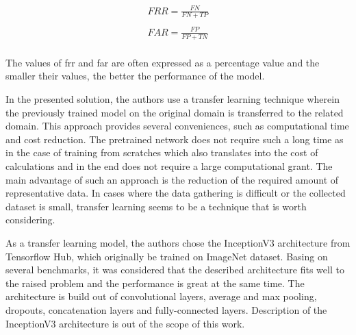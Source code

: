 \begin{gather*}
    FRR = \frac{FN}{FN + TP}\\
    \\
    FAR = \frac{FP}{FP + TN}\\
\end{gather*}

The values of \gls{frr} and \gls{far} are often expressed as a percentage value and the smaller their values, the better the performance of the model.

In the presented solution, the authors use a transfer learning technique wherein the previously trained model on the original domain is transferred to the related domain.
This approach provides several conveniences, such as computational time and cost reduction.
The pretrained network does not require such a long time as in the case of training from scratches which also translates into the cost of calculations and in the end does not require a large computational grant.
The main advantage of such an approach is the reduction of the required amount of representative data.
In cases where the data gathering is difficult or the collected dataset is small, transfer learning seems to be a technique that is worth considering.

As a transfer learning model, the authors chose the InceptionV3 architecture from Tensorflow Hub, which originally be trained on ImageNet dataset.
Basing on several benchmarks, it was considered that the described architecture fits well to the raised problem and the performance is great at the same time.
The architecture is build out of convolutional layers, average and max pooling, dropouts, concatenation layers and fully-connected layers.
Description of the InceptionV3 architecture is out of the scope of this work.

